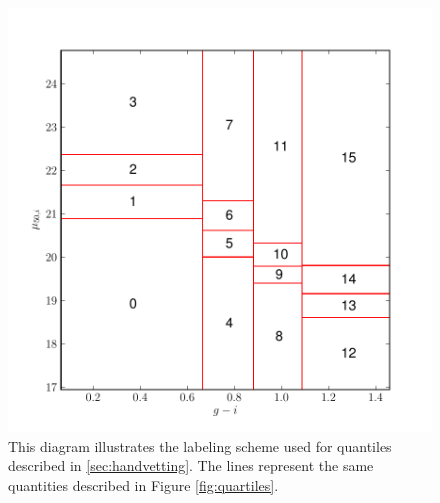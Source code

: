 \documentclass[12pt,preprint,pdftex]{aastex}
\begin{document}
\begin{figure}
\centering
\includegraphics[trim =0mm 0mm 0mm 10mm]{quartile_diagram.pdf}
\caption{This diagram illustrates the labeling scheme used for quantiles described in \ref{sec:handvetting}. The lines represent the same quantities described in Figure \ref{fig:quartiles}.}
\label{fig:quartilediagram}
\end{figure}
\end{document}
